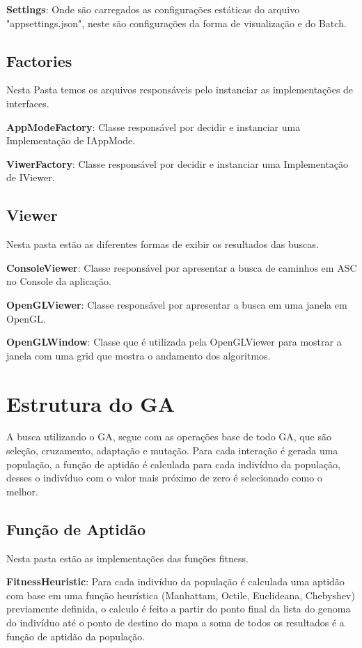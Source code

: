\textbf{Settings}: Onde são carregados as configurações estáticas do arquivo "appsettings.json", neste são configurações da forma de visualização e do Batch.

\subsection{Factories}

Nesta Pasta temos os arquivos responsáveis pelo instanciar as implementações de interfaces.

\textbf{AppModeFactory}: Classe responsável por decidir e instanciar uma Implementação de IAppMode.

\textbf{ViwerFactory}: Classe responsável por decidir e instanciar uma Implementação de IViewer.

\subsection{Viewer}

Nesta pasta estão as diferentes formas de exibir os resultados das buscas.

\textbf{ConsoleViewer}: Classe responsável por apresentar a busca de caminhos em ASC no Console da aplicação.

\textbf{OpenGLViewer}: Classe responsável por apresentar a busca em uma janela em OpenGL.

\textbf{OpenGLWindow}: Classe que é utilizada pela OpenGLViewer para mostrar a janela com uma grid que mostra o andamento dos algoritmos.

\section{Estrutura do GA}

A busca utilizando o GA, segue com as operações base de todo GA, que são seleção, cruzamento, adaptação e mutação. 
Para cada interação é gerada uma população, a função de aptidão é calculada para cada indivíduo da população, 
desses o indivíduo com o valor mais próximo de zero é selecionado como o melhor.

\subsection{Função de Aptidão}

Nesta pasta estão as implementações das funções fitness.

\textbf{FitnessHeuristic}: Para cada indivíduo da população é calculada uma aptidão com base em uma função heurística (Manhattam, Octile, Euclideana, Chebyshev)
previamente definida, o calculo é feito a partir do ponto final da lista do genoma do indivíduo até o ponto de destino do mapa
a soma de todos os resultados é a função de aptidão da população.

